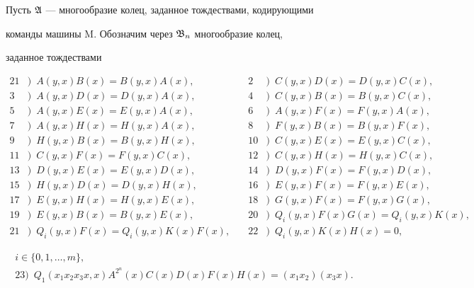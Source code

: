 \medskip 


 


Пусть $\frak A$ --- многообразие колец, заданное тождествами, кодирующими  


команды машины M. Обозначим через $\frak B_n$ многообразие колец,  


заданное тождествами 


\begin{alignat*}{2} 


1&)\ \; A(y,x)B(x)=B(y,x)A(x),&\quad 2&)\ \;C(y,x)D(x)=D(y,x)C(x),\\ 


3&)\ \; A(y,x)D(x)=D(y,x)A(x),&\quad 4&)\ \;C(y,x)B(x)=B(y,x)C(x),\\ 


5&)\ \; A(y,x)E(x)=E(y,x)A(x),&\quad 6&)\ \;A(y,x)F(x)=F(y,x)A(x),\\ 


7&)\ \; A(y,x)H(x)=H(y,x)A(x),&\quad 8&)\ \;F(y,x)B(x)=B(y,x)F(x),\\ 


9&)\ \; H(y,x)B(x)=B(y,x)H(x),&\quad 10&)\ \;C(y,x)E(x)=E(y,x)C(x),\\ 


11&)\ \; C(y,x)F(x)=F(y,x)C(x),&\quad 12&)\ \;C(y,x)H(x)=H(y,x)C(x),\\ 


13&)\ \; D(y,x)E(x)=E(y,x)D(x),&\quad 14&)\ \;D(y,x)F(x)=F(y,x)D(x),\\ 


15&)\ \; H(y,x)D(x)=D(y,x)H(x),&\quad 16&)\ \;E(y,x)F(x)=F(y,x)E(x),\\ 


17&)\ \; E(y,x)H(x)=H(y,x)E(x),&\quad 18&)\ \;G(y,x)F(x)=F(y,x)G(x),\\ 


19&)\ \; E(y,x)B(x)=B(y,x)E(x),&\quad 20&)\ \;Q_i(y,x) 


F(x)G(x)=Q_i(y,x)K(x), \\ 


21&)\ \; Q_i(y,x)F(x)=Q_i(y,x)K(x)F(x),&\quad 22&)\ \; 


Q_i(y,x)K(x)H(x)=0, 


\end{alignat*} 


\begin{gather*} 


i\in\{0,1,\dotsc,m\},\\ 


23)\ \; Q_1(x_1x_2x_3x,x)A^{2^n}(x)C(x)D(x)F(x)H(x)=(x_1x_2)(x_3x). 


\end{gather*} 


